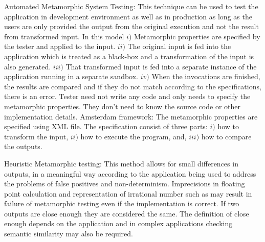 		Automated Metamorphic System Testing: This technique can be used to test the application in development environment as well as in production as long as the users are only provided the output from the original execution and not the result from transformed input. In this model $i)$ Metamorphic properties are specified by the tester and applied to the input. $ii)$ The original input is fed into the application which is treated as a black-box and a transformation of the input is also generated. $iii)$ That transformed input is fed into a separate instance of the application running in a separate sandbox. $iv)$ When the invocations are finished, the results are compared and if they do not match according to the specifications, there is an error.
		Tester need not write any code and only needs to specify the metamorphic properties. They don’t need to know the source code or other implementation details.
		Amsterdam framework: The metamorphic properties are specified using XML file. The specification consist of three parts: $i)$ how to transform the input, $ii)$ how to execute the program, and, $iii)$ how to compare the outputs.\par
		Heuristic Metamorphic testing: This method allows for small differences in outputs, in a meaningful way according to the application being used to address the problems of false positives and non-determinism. Imprecisions in floating point calculation and representation of irrational number such as may result in failure of metamorphic testing even if the implementation is correct. If two outputs are close enough they are considered the same. The definition of close enough depends on the application and in complex applications checking semantic similarity may also be required.
